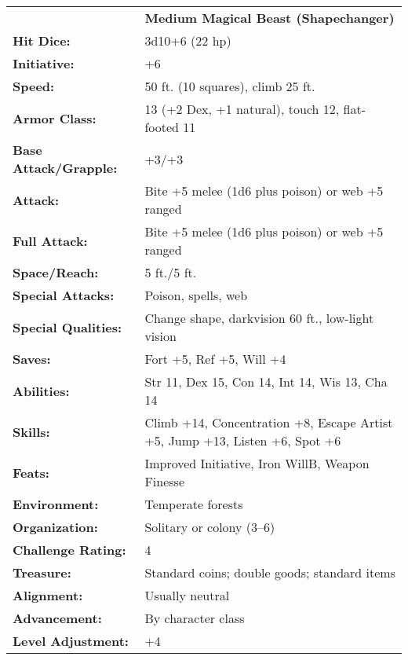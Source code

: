 \documentclass[../main.tex]{subfiles}
\begin{document}

  \begin{table}[H]
    \centering
    \begin{tabular}{lp{12em}}
      & \textbf{Medium Magical Beast (Shapechanger)} \\
      \textbf{Hit Dice:} & 3d10+6 (22 hp) \\
      \textbf{Initiative:} & +6 \\
      \textbf{Speed:} & 50 ft. (10 squares), climb 25 ft. \\
      \textbf{Armor Class:} & 13 (+2 Dex, +1 natural), touch 12, flat-footed 11 \\
      \textbf{Base Attack/Grapple:} & +3/+3 \\
      \textbf{Attack:} & Bite +5 melee (1d6 plus poison) or web +5 ranged \\
      \textbf{Full Attack:} & Bite +5 melee (1d6 plus poison) or web +5 ranged \\
      \textbf{Space/Reach:} & 5 ft./5 ft. \\
      \textbf{Special Attacks:} & Poison, spells, web \\
      \textbf{Special Qualities:} & Change shape, darkvision 60 ft., low-light vision \\
      \textbf{Saves:} & Fort +5, Ref +5, Will +4 \\
      \textbf{Abilities:} & Str 11, Dex 15, Con 14, Int 14, Wis 13, Cha 14 \\
      \textbf{Skills:} & Climb +14, Concentration +8, Escape Artist +5, Jump +13, Listen +6, Spot +6 \\
      \textbf{Feats:} & Improved Initiative, Iron WillB, Weapon Finesse \\
      \textbf{Environment:} & Temperate forests \\
      \textbf{Organization:} & Solitary or colony (3–6) \\
      \textbf{Challenge Rating:} & 4 \\
      \textbf{Treasure:} & Standard coins; double goods; standard items \\
      \textbf{Alignment:} & Usually neutral \\
      \textbf{Advancement:} & By character class \\
      \textbf{Level Adjustment:} & +4 \\
    \end{tabular}
  \end{table}
\end{document}
